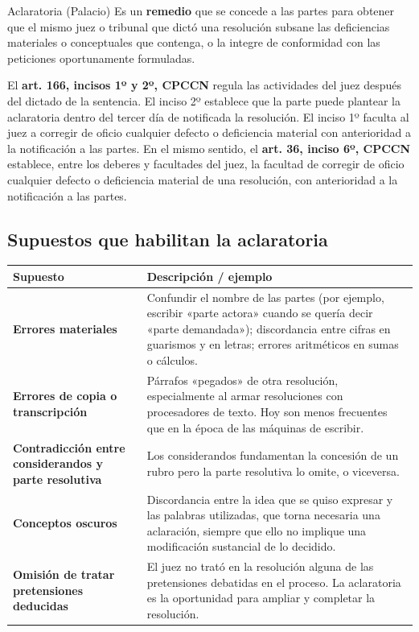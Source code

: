 \documentclass[12pt,oneside]{book}
\begin{document}
\begin{definition}{Aclaratoria (Palacio)}
Es un \textbf{remedio} que se concede a las partes para obtener que el mismo juez o tribunal que dictó una resolución subsane las deficiencias materiales o conceptuales que contenga, o la integre de conformidad con las peticiones oportunamente formuladas.
\end{definition}

El \textbf{art. 166, incisos 1º y 2º, CPCCN} regula las actividades del juez después del dictado de la sentencia. El inciso 2º establece que la parte puede plantear la aclaratoria dentro del tercer día de notificada la resolución. El inciso 1º faculta al juez a corregir de oficio cualquier defecto o deficiencia material con anterioridad a la notificación a las partes. En el mismo sentido, el \textbf{art. 36, inciso 6º, CPCCN} establece, entre los deberes y facultades del juez, la facultad de corregir de oficio cualquier defecto o deficiencia material de una resolución, con anterioridad a la notificación a las partes.

\subsection{Supuestos que habilitan la aclaratoria}

\begin{table}[H]
\centering
\small
\begin{tabularx}{\textwidth}{L{0.28\textwidth} >{\raggedright\arraybackslash}X}
\toprule
\textbf{Supuesto} & \textbf{Descripción / ejemplo} \\
\midrule
\textbf{Errores materiales} &
Confundir el nombre de las partes (por ejemplo, escribir «parte actora» cuando se quería decir «parte demandada»); discordancia entre cifras en guarismos y en letras; errores aritméticos en sumas o cálculos. \\
\midrule
\textbf{Errores de copia o transcripción} &
Párrafos «pegados» de otra resolución, especialmente al armar resoluciones con procesadores de texto. Hoy son menos frecuentes que en la época de las máquinas de escribir. \\
\midrule
\textbf{Contradicción entre considerandos y parte resolutiva} &
Los considerandos fundamentan la concesión de un rubro pero la parte resolutiva lo omite, o viceversa. \\
\midrule
\textbf{Conceptos oscuros} &
Discordancia entre la idea que se quiso expresar y las palabras utilizadas, que torna necesaria una aclaración, siempre que ello no implique una modificación sustancial de lo decidido. \\
\midrule
\textbf{Omisión de tratar pretensiones deducidas} &
El juez no trató en la resolución alguna de las pretensiones debatidas en el proceso. La aclaratoria es la oportunidad para ampliar y completar la resolución. \\
\bottomrule
\end{tabularx}
\end{table}
\end{document}

